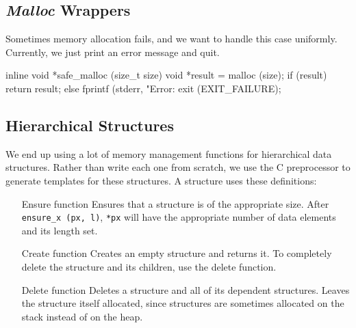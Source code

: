 \documentclass{article}
\begin{document}
    \subsection{{\em Malloc} Wrappers}
      \label{sec:malloc}

      Sometimes memory allocation fails, and we want to handle this case
      uniformly. Currently, we just print an error message and quit.

\begin{ccode}
inline void *safe_malloc (size_t size) {
  void *result = malloc (size);
  if (result)
    return result;
  else {
    fprintf (stderr, "Error: %
    exit (EXIT_FAILURE);
  }
}
\end{ccode}

    \subsection{Hierarchical Structures}
      \label{sec:hierarchical}

      We end up using a lot of memory management functions for hierarchical data
      structures. Rather than write each one from scratch, we use the C
      preprocessor to generate templates for these structures. A structure uses
      these definitions:

      \begin{enumerate}
        \item[Ensure function]
        Ensures that a structure is of the appropriate size. After
        \verb|ensure_x (px, l)|, \verb|*px| will have the appropriate number of
        data elements and its length set.

        \item[Create function]
        Creates an empty structure and returns it. To completely delete the
        structure and its children, use the delete function.

        \item[Delete function]
        Deletes a structure and all of its dependent structures. Leaves the
        structure itself allocated, since structures are sometimes allocated on
        the stack instead of on the heap.
      \end{enumerate}
\end{document}

